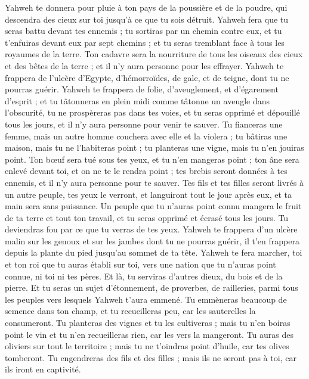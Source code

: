 \begin{multicols}{2}
Yahweh te donnera pour pluie à ton pays de la poussière et de la poudre, qui descendra des cieux sur toi jusqu'à ce que tu sois détruit.
Yahweh fera que tu seras battu devant tes ennemis ; tu sortiras par un chemin contre eux, et tu t'enfuiras devant eux par sept chemins ; et tu seras tremblant face à tous les royaumes de la terre.
Ton cadavre sera la nourriture de tous les oiseaux des cieux et des bêtes de la terre ; et il n'y aura personne pour les effrayer.
Yahweh te frappera de l'ulcère d'Egypte, d'hémorroïdes, de gale, et de teigne, dont tu ne pourras guérir.
Yahweh te frappera de folie, d'aveuglement, et d'égarement d'esprit ;
et tu tâtonneras en plein midi comme tâtonne un aveugle dans l'obscurité, tu ne prospèreras pas dans tes voies, et tu seras opprimé et dépouillé tous les jours, et il n'y aura personne pour venir te sauver.
Tu fianceras une femme, mais un autre homme couchera avec elle et la violera ; tu bâtiras une maison, mais tu ne l'habiteras point ; tu planteras une vigne, mais tu n'en jouiras point.
Ton bœuf sera tué sous tes yeux, et tu n'en mangeras point ; ton âne sera enlevé devant toi, et on ne te le rendra point ; tes brebis seront données à tes ennemis, et il n'y aura personne pour te sauver.
Tes fils et tes filles seront livrés à un autre peuple, tes yeux le verront, et languiront tout le jour après eux, et ta main sera sans puissance.
Un peuple que tu n'auras point connu mangera le fruit de ta terre et tout ton travail, et tu seras opprimé et écrasé tous les jours.
Tu deviendras fou par ce que tu verras de tes yeux.
Yahweh te frappera d'un ulcère malin sur les genoux et sur les jambes dont tu ne pourras guérir, il t'en frappera depuis la plante du pied jusqu'au sommet de ta tête.
Yahweh te fera marcher, toi et ton roi que tu auras établi sur toi, vers une nation que tu n'auras point connue, ni toi ni tes pères. Et là, tu serviras d'autres dieux, du bois et de la pierre.
Et tu seras un sujet d'étonnement, de proverbes, de railleries, parmi tous les peuples vers lesquels Yahweh t'aura emmené.
Tu emmèneras beaucoup de semence dans ton champ, et tu recueilleras peu, car les sauterelles la consumeront.
Tu planteras des vignes et tu les cultiveras ; mais tu n'en boiras point le vin et tu n'en recueilleras rien, car les vers la mangeront.
Tu auras des oliviers sur tout le territoire ; mais tu ne t'oindras point d'huile, car tes olives tomberont.
Tu engendreras des fils et des filles ; mais ils ne seront pas à toi, car ils iront en captivité.

\end{multicols}
